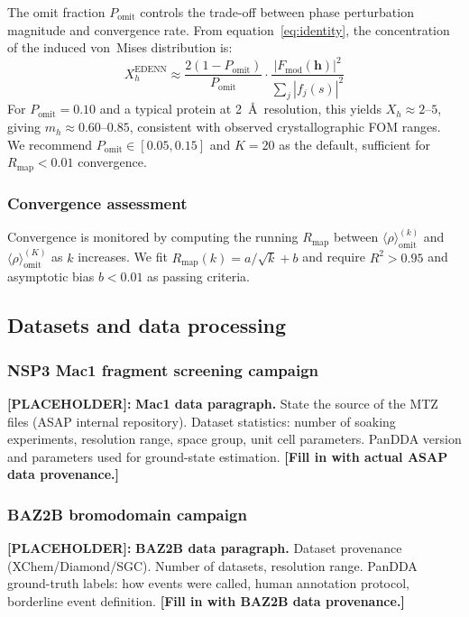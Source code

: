 \documentclass[10pt,twocolumn]{article}
\newcommand{\placeholder}[1]{%
  \begin{mdframed}[
    linecolor=placeholder,linewidth=1pt,
    backgroundcolor=red!5,
    innertopmargin=6pt,innerbottommargin=6pt,
    innerleftmargin=8pt,innerrightmargin=8pt]
  \small\color{placeholder}\textbf{[PLACEHOLDER]:} #1
  \end{mdframed}
}
\newcommand{\Fmod}{F_{\!\mathrm{mod}}}
\newcommand{\mh}{m_h}
\newcommand{\Xh}{X_h}
\newcommand{\rhoens}{\langle\rho\rangle_{\mathrm{omit}}}
\newcommand{\boldh}{\mathbf{h}}
\begin{document}
The omit fraction $P_{\mathrm{omit}}$ controls the trade-off between
phase perturbation magnitude and convergence rate.
From equation~\eqref{eq:identity}, the concentration of the
induced von~Mises distribution is:
\begin{equation}
  \Xh^{\mathrm{EDENN}} \approx
  \frac{2(1-P_{\mathrm{omit}})}{P_{\mathrm{omit}}}
  \cdot \frac{|\Fmod(\boldh)|^2}{\sum_j |f_j(s)|^2}
  \label{eq:X_edenn}
\end{equation}
For $P_{\mathrm{omit}} = 0.10$ and a typical protein at 2~\AA\
resolution, this yields $\Xh \approx 2$--$5$, giving $\mh \approx
0.60$--$0.85$, consistent with observed crystallographic FOM ranges.
We recommend $P_{\mathrm{omit}} \in [0.05, 0.15]$ and $K = 20$ as
the default, sufficient for $R_{\mathrm{map}} < 0.01$ convergence.

\subsubsection{Convergence assessment}

Convergence is monitored by computing the running $R_{\mathrm{map}}$
between $\rhoens^{(k)}$ and $\rhoens^{(K)}$ as $k$ increases.
We fit $R_{\mathrm{map}}(k) = a/\sqrt{k} + b$ and require
$R^2 > 0.95$ and asymptotic bias $b < 0.01$ as passing criteria.

\subsection{Datasets and data processing}

\subsubsection{NSP3 Mac1 fragment screening campaign}

\placeholder{
\textbf{Mac1 data paragraph.}
State the source of the MTZ files (ASAP internal repository).
Dataset statistics: number of soaking experiments, resolution
range, space group, unit cell parameters.
PanDDA version and parameters used for ground-state estimation.
\textbf{[Fill in with actual ASAP data provenance.]}
}

\subsubsection{BAZ2B bromodomain campaign}

\placeholder{
\textbf{BAZ2B data paragraph.}
Dataset provenance (XChem/Diamond/SGC).
Number of datasets, resolution range.
PanDDA ground-truth labels: how events were called, human
annotation protocol, borderline event definition.
\textbf{[Fill in with BAZ2B data provenance.]}
}
\end{document}
